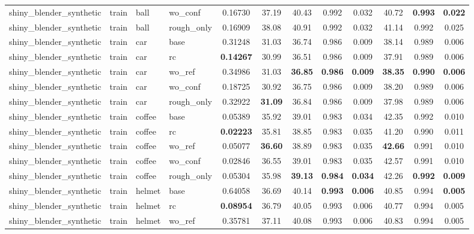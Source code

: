 \begin{table}[t]
{\begin{tabular}{llllcccccccc}
shiny\_blender\_synthetic & train & ball & wo\_conf & 0.16730 & 37.19 & 40.43 & 0.992 & 0.032 & 40.72 & \textbf{0.993} & \textbf{0.022} \\
shiny\_blender\_synthetic & train & ball & rough\_only & 0.16909 & 38.08 & 40.91 & 0.992 & 0.032 & 41.14 & 0.992 & 0.025 \\
shiny\_blender\_synthetic & train & car & base & 0.31248 & 31.03 & 36.74 & 0.986 & 0.009 & 38.14 & 0.989 & 0.006 \\
shiny\_blender\_synthetic & train & car & rc & \textbf{0.14267} & 30.99 & 36.51 & 0.986 & 0.009 & 37.91 & 0.989 & 0.006 \\
shiny\_blender\_synthetic & train & car & wo\_ref & 0.34986 & 31.03 & \textbf{36.85} & \textbf{0.986} & \textbf{0.009} & \textbf{38.35} & \textbf{0.990} & \textbf{0.006} \\
shiny\_blender\_synthetic & train & car & wo\_conf & 0.18725 & 30.92 & 36.75 & 0.986 & 0.009 & 38.20 & 0.989 & 0.006 \\
shiny\_blender\_synthetic & train & car & rough\_only & 0.32922 & \textbf{31.09} & 36.84 & 0.986 & 0.009 & 37.98 & 0.989 & 0.006 \\
shiny\_blender\_synthetic & train & coffee & base & 0.05389 & 35.92 & 39.01 & 0.983 & 0.034 & 42.35 & 0.992 & 0.010 \\
shiny\_blender\_synthetic & train & coffee & rc & \textbf{0.02223} & 35.81 & 38.85 & 0.983 & 0.035 & 41.20 & 0.990 & 0.011 \\
shiny\_blender\_synthetic & train & coffee & wo\_ref & 0.05077 & \textbf{36.60} & 38.89 & 0.983 & 0.035 & \textbf{42.66} & 0.991 & 0.010 \\
shiny\_blender\_synthetic & train & coffee & wo\_conf & 0.02846 & 36.55 & 39.01 & 0.983 & 0.035 & 42.57 & 0.991 & 0.010 \\
shiny\_blender\_synthetic & train & coffee & rough\_only & 0.05304 & 35.98 & \textbf{39.13} & \textbf{0.984} & \textbf{0.034} & 42.26 & \textbf{0.992} & \textbf{0.009} \\
shiny\_blender\_synthetic & train & helmet & base & 0.64058 & 36.69 & 40.14 & \textbf{0.993} & \textbf{0.006} & 40.85 & 0.994 & \textbf{0.005} \\
shiny\_blender\_synthetic & train & helmet & rc & \textbf{0.08954} & 36.79 & 40.05 & 0.993 & 0.006 & 40.77 & 0.994 & 0.005 \\
shiny\_blender\_synthetic & train & helmet & wo\_ref & 0.35781 & 37.11 & 40.08 & 0.993 & 0.006 & 40.83 & 0.994 & 0.005 \\

\end{tabular}}
\end{table}
